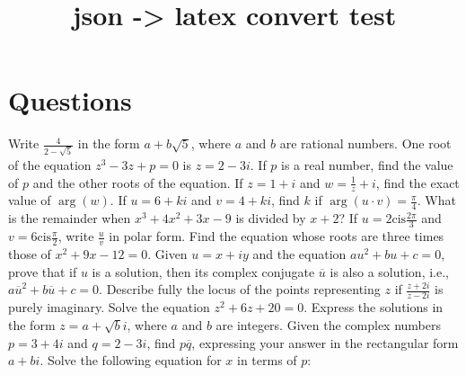 \documentclass[12pt,addpoints]{exam}
\begin{document}
\title{json -> latex convert test}
\author{}
\date{}
\maketitle
\section*{Questions}
\begin{questions}
\pointsinrightmargin
\bracketedpoints
\question[5] Write \(\frac{4}{2 - \sqrt{5}}\) in the form \(a + b\sqrt{5}\), where \(a\) and \(b\) are rational numbers.
\fillwithlines{5cm}
\question[5] One root of the equation \( z^3 - 3z + p = 0 \) is \( z = 2 - 3i \). If \( p \) is a real number, find the value of \( p \) and the other roots of the equation.
\fillwithlines{5cm}
\question[5] If \( z = 1 + i \) and \( w = \frac{1}{z} + i \), find the exact value of \(\arg(w)\).
\fillwithlines{5cm}
\question[5] If \( u = 6 + ki \) and \( v = 4 + ki \), find \( k \) if \(\arg(u \cdot v) = \frac{\pi}{4}\).
\fillwithlines{5cm}
\question[5] What is the remainder when \( x^3 + 4x^2 + 3x - 9 \) is divided by \( x + 2 \)?
\fillwithlines{5cm}
\question[5] If \( u = 2 \text{cis} \frac{2\pi}{3} \) and \( v = 6 \text{cis} \frac{\pi}{2} \), write \( \frac{u}{v} \) in polar form.
\fillwithlines{5cm}
\question[5] Find the equation whose roots are three times those of \( x^2 + 9x - 12 = 0 \).
\fillwithlines{5cm}
\question[5] Given \( u = x + iy \) and the equation \( au^2 + bu + c = 0 \), prove that if \( u \) is a solution, then its complex conjugate \( \overline{u} \) is also a solution, i.e., \( a\overline{u}^2 + b\overline{u} + c = 0 \).
\fillwithlines{5cm}
\question[5] Describe fully the locus of the points representing \( z \) if \(\frac{z + 2i}{z - 2i}\) is purely imaginary.
\fillwithlines{5cm}
\question[5] Solve the equation \( z^2 + 6z + 20 = 0 \). Express the solutions in the form \( z = a + \sqrt{b}i \), where \( a \) and \( b \) are integers.
\fillwithlines{5cm}
\question[5] Given the complex numbers \( p = 3 + 4i \) and \( q = 2 - 3i \), find \( p\overline{q} \), expressing your answer in the rectangular form \( a + bi \).
\fillwithlines{5cm}
\question[5] Solve the following equation for \( x \) in terms of \( p \):


\end{questions}
\end{document}

